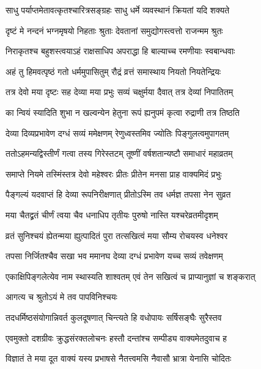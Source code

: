 \twolineshloka
{साधु पर्याप्तमेतावत्कृतश्चारित्रसङ्ग्रहः}
{साधु धर्मे व्यवस्थानं क्रियतां यदि शक्यते} %

\twolineshloka
{दृष्टं मे नन्दनं भग्नमृषयो निहताः श्रुताः}
{देवतानां समुद्योगस्त्वत्तो राजन्मम श्रुतः} %

\twolineshloka
{निराकृतश्च बहुशस्त्वयाऽहं राक्षसाधिप}
{अपराद्धा हि बाल्याच्च रमणीयाः स्वबान्धवाः} %

\twolineshloka
{अहं तु हिमवत्पृष्ठं गतो धर्ममुपासितुम्}
{रौद्रं व्रत्तं समास्थाय नियतो नियतेन्द्रियः} %

\twolineshloka
{तत्र देवो मया दृष्टः सह देव्या मया प्रभुः}
{सव्यं चक्षुर्मया दैवात् तत्र देव्यां निपातितम्} %

\twolineshloka
{का न्वियं स्यादिति शुभा न खल्वन्येन हेतुना}
{रूपं ह्यनुपमं कृत्वा रुद्राणी तत्र तिष्ठति} %

\twolineshloka
{देव्या दिव्यप्रभावेण दग्धं सव्यं ममेक्षणम्}
{रेणुध्वस्तमिव ज्योतिः पिङ्गुलत्वमुपागतम्} %

\twolineshloka
{ततोऽहमन्यद्विस्तीर्णं गत्वा तस्य गिरेस्तटम्}
{तूष्णीं वर्षशतान्यष्टौ समाधारं महाव्रतम्} %

\twolineshloka
{समाप्ते नियमे तस्मिंस्तत्र देवो महेश्वरः}
{प्रीतः प्रीतेन मनसा प्राह वाक्यमिदं प्रभुः} %

\twolineshloka
{पैङ्गल्यं यदवाप्तं हि देव्या रूपनिरीक्षणात्}
{प्रीतोऽस्मि तव धर्मज्ञ तपसा नेन सुव्रत} %

\twolineshloka
{मया चैतद्व्रतं चीर्णं त्वया चैव धनाधिप}
{तृतीयः पुरुषो नास्ति यश्चरेव्रतमीदृशम्} %

\twolineshloka
{व्रतं सुनिश्चयं ह्येतन्मया ह्युत्पादितं पुरा}
{तत्सखित्वं मया सौम्य रोचयस्व धनेश्वर} %

\twolineshloka
{तपसा निर्जितश्चैव सखा भव ममानघ}
{देव्या दग्धं प्रभावेण यच्च सव्यं तवेक्षणम्} %

\twolineshloka
{एकाक्षिपिङ्गलेत्येव नाम स्थास्यति शाश्वतम्}
{एवं तेन सखित्वं च प्राप्यानुज्ञां च शङ्करात्} %

\onelineshloka
{आगत्य च श्रुतोऽयं मे तव पापविनिश्चयः} %

\twolineshloka
{तदधर्मिष्ठसंयोगान्निवर्त कुलदूषणात्}
{चिन्त्यते हि वधोपायः सर्षिसङ्घैः सुरैस्तव} %

\twolineshloka
{एवमुक्तो दशग्रीवः क्रुद्धसंरक्तलोचनः}
{हस्तौ दन्तांश्च सम्पीड्य वाक्यमेतदुवाच ह} %

\twolineshloka
{विज्ञातं ते मया दूत वाक्यं यस्य प्रभाषसे}
{नैतत्त्वमसि नैवासौ भ्रात्रा येनासि चोदितः} %

